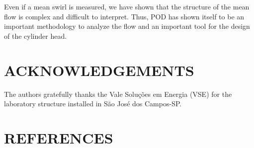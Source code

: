 \documentclass[10pt,fleqn,a4paper]{article}
\begin{document}
Even if a mean swirl is measured, we have shown that the structure of the mean flow is complex and difficult to interpret. Thus, POD has shown itself to be an important methodology to analyze the flow and an important tool for the design of the cylinder head.


\section{ACKNOWLEDGEMENTS}

The authors gratefully thanks the Vale Solu\c{c}\~{o}es em Energia (VSE) for the laboratory structure installed in S\~{a}o Jos\'{e} dos Campos-SP.


\section{REFERENCES}
\end{document}
